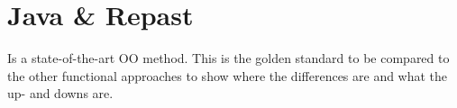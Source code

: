 
\chapter{Java \& Repast} 
Is a state-of-the-art OO method. This is the golden standard to be compared to the other functional approaches to show where the differences are and what the up- and downs are.